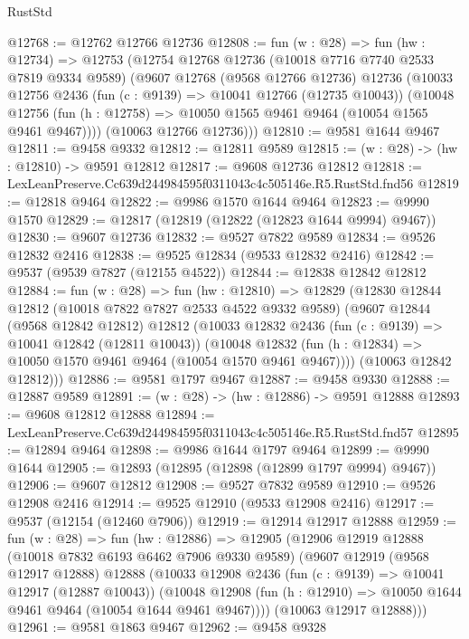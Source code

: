 \begin{lexlean}{RustStd}
\begin{coremodule}
@12768 := @12762 @12766 @12736
@12808 := fun (w : @28) =>
  fun (hw : @12734) =>
  @12753
    (@12754
      @12768
      @12736
      (@10018 @7716 @7740 @2533 @7819 @9334 @9589)
      (@9607
        @12768
        (@9568 @12766 @12736)
        @12736
        (@10033
          @12756
          @2436
          (fun (c : @9139) => @10041 @12766 (@12735 @10043))
          (@10048 @12756 (fun (h : @12758) => @10050 @1565 @9461 @9464 (@10054 @1565 @9461 @9467))))
        (@10063 @12766 @12736)))
@12810 := @9581 @1644 @9467
@12811 := @9458 @9332
@12812 := @12811 @9589
@12815 := (w : @28) -> (hw : @12810) -> @9591 @12812
@12817 := @9608 @12736 @12812
@12818 := LexLeanPreserve.Cc639d244984595f0311043c4c505146e.R5.RustStd.fnd56
@12819 := @12818 @9464
@12822 := @9986 @1570 @1644 @9464
@12823 := @9990 @1570
@12829 := @12817 (@12819 (@12822 (@12823 @1644 @9994) @9467))
@12830 := @9607 @12736
@12832 := @9527 @7822 @9589
@12834 := @9526 @12832 @2416
@12838 := @9525 @12834 (@9533 @12832 @2416)
@12842 := @9537 (@9539 @7827 (@12155 @4522))
@12844 := @12838 @12842 @12812
@12884 := fun (w : @28) =>
  fun (hw : @12810) =>
  @12829
    (@12830
      @12844
      @12812
      (@10018 @7822 @7827 @2533 @4522 @9332 @9589)
      (@9607
        @12844
        (@9568 @12842 @12812)
        @12812
        (@10033
          @12832
          @2436
          (fun (c : @9139) => @10041 @12842 (@12811 @10043))
          (@10048 @12832 (fun (h : @12834) => @10050 @1570 @9461 @9464 (@10054 @1570 @9461 @9467))))
        (@10063 @12842 @12812)))
@12886 := @9581 @1797 @9467
@12887 := @9458 @9330
@12888 := @12887 @9589
@12891 := (w : @28) -> (hw : @12886) -> @9591 @12888
@12893 := @9608 @12812 @12888
@12894 := LexLeanPreserve.Cc639d244984595f0311043c4c505146e.R5.RustStd.fnd57
@12895 := @12894 @9464
@12898 := @9986 @1644 @1797 @9464
@12899 := @9990 @1644
@12905 := @12893 (@12895 (@12898 (@12899 @1797 @9994) @9467))
@12906 := @9607 @12812
@12908 := @9527 @7832 @9589
@12910 := @9526 @12908 @2416
@12914 := @9525 @12910 (@9533 @12908 @2416)
@12917 := @9537 (@12154 (@12460 @7906))
@12919 := @12914 @12917 @12888
@12959 := fun (w : @28) =>
  fun (hw : @12886) =>
  @12905
    (@12906
      @12919
      @12888
      (@10018 @7832 @6193 @6462 @7906 @9330 @9589)
      (@9607
        @12919
        (@9568 @12917 @12888)
        @12888
        (@10033
          @12908
          @2436
          (fun (c : @9139) => @10041 @12917 (@12887 @10043))
          (@10048 @12908 (fun (h : @12910) => @10050 @1644 @9461 @9464 (@10054 @1644 @9461 @9467))))
        (@10063 @12917 @12888)))
@12961 := @9581 @1863 @9467
@12962 := @9458 @9328

\end{coremodule}
\end{lexlean}
